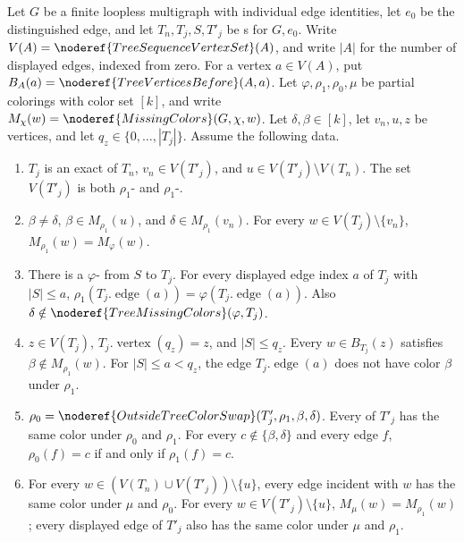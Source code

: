 \begin{helper}
Let \(G\) be a finite loopless multigraph with individual edge identities,
let \(e_0\) be the distinguished edge, and let
\(T_n,T_j,S,T'_j\) be s for \(G,e_0\).
Write \(V(A)=\noderef{TreeSequenceVertexSet}(A)\), and write \(|A|\)
for the number of displayed edges, indexed from zero.
For a vertex \(a\in V(A)\), put
\(B_A(a)=\noderef{TreeVerticesBefore}(A,a)\).
Let \(\varphi,\rho_1,\rho_0,\mu\) be partial colorings with color set
\([k]\), and write \(M_\chi(w)=\noderef{MissingColors}(G,\chi,w)\).
Let \(\delta,\beta\in[k]\), let \(v_n,u,z\) be vertices, and let
\(q_z\in\{0,\ldots,|T_j|\}\).  Assume the following data.
\begin{enumerate}
\item \(T_j\) is an exact  of
\(T_n\), \(v_n\in V(T'_j)\), and
\(u\in V(T'_j)\setminus V(T_n)\).
The set \(V(T'_j)\) is both \(\rho_1\)-
and \(\rho_1\)-.
\item \(\beta\ne\delta\), \(\beta\in M_{\rho_1}(u)\), and
\(\delta\in M_{\rho_1}(v_n)\).
For every \(w\in V(T_j)\setminus\{v_n\}\),
\(M_{\rho_1}(w)=M_\varphi(w)\).
\item There is a \(\varphi\)-
from \(S\) to \(T_j\).
For every displayed edge index \(a\) of \(T_j\) with \(|S|\le a\),
\(\rho_1(T_j.\operatorname{edge}(a))
=\varphi(T_j.\operatorname{edge}(a))\).
Also \(\delta\notin\noderef{TreeMissingColors}(\varphi,T_j)\).
\item \(z\in V(T_j)\), \(T_j.\operatorname{vertex}(q_z)=z\), and
\(|S|\le q_z\).
Every \(w\in B_{T_j}(z)\) satisfies \(\beta\notin M_{\rho_1}(w)\).
For \(|S|\le a<q_z\), the edge \(T_j.\operatorname{edge}(a)\)
does not have color \(\beta\) under \(\rho_1\).
\item \(\rho_0=\noderef{OutsideTreeColorSwap}(T'_j,\rho_1,\beta,\delta)\).
Every  of \(T'_j\) has the same color
under \(\rho_0\) and \(\rho_1\).
For every \(c\notin\{\beta,\delta\}\) and every edge \(f\),
\(\rho_0(f)=c\) if and only if \(\rho_1(f)=c\).
\item For every \(w\in(V(T_n)\cup V(T'_j))\setminus\{u\}\),
every edge incident with \(w\) has the same color under \(\mu\) and
\(\rho_0\).
For every \(w\in V(T'_j)\setminus\{u\}\),
\(M_\mu(w)=M_{\rho_1}(w)\); every displayed edge of \(T'_j\)
also has the same color under \(\mu\) and \(\rho_1\).

\end{enumerate}
\end{helper}
